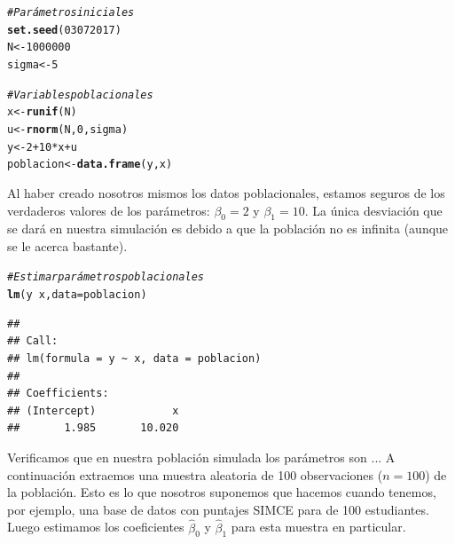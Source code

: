 \documentclass[12pt]{report}\usepackage[]{graphicx}\usepackage[]{color}
\makeatletter
\newcommand{\hlnum}[1]{\textcolor[rgb]{0.686,0.059,0.569}{#1}}%
\newcommand{\hlcom}[1]{\textcolor[rgb]{0.678,0.584,0.686}{\textit{#1}}}%
\newcommand{\hlopt}[1]{\textcolor[rgb]{0,0,0}{#1}}%
\newcommand{\hlstd}[1]{\textcolor[rgb]{0.345,0.345,0.345}{#1}}%
\newcommand{\hlkwb}[1]{\textcolor[rgb]{0.69,0.353,0.396}{#1}}%
\newcommand{\hlkwc}[1]{\textcolor[rgb]{0.333,0.667,0.333}{#1}}%
\newcommand{\hlkwd}[1]{\textcolor[rgb]{0.737,0.353,0.396}{\textbf{#1}}}%
\newenvironment{kframe}{%
 \def\at@end@of@kframe{}%
 \ifinner\ifhmode%
  \def\at@end@of@kframe{\end{minipage}}%
  \begin{minipage}{\columnwidth}%
 \fi\fi%
 \def\FrameCommand##1{\hskip\@totalleftmargin \hskip-\fboxsep
 \colorbox{shadecolor}{##1}\hskip-\fboxsep
     \hskip-\linewidth \hskip-\@totalleftmargin \hskip\columnwidth}%
 \MakeFramed {\advance\hsize-\width
   \@totalleftmargin\z@ \linewidth\hsize
   \@setminipage}}%
 {\par\unskip\endMakeFramed%
 \at@end@of@kframe}
\newenvironment{knitrout}{}{} %
\makeatother
\begin{document}
\begin{knitrout}
\color{fgcolor}\begin{kframe}
\begin{alltt}
\hlcom{# Parámetros iniciales}
\hlkwd{set.seed}\hlstd{(}\hlnum{03072017}\hlstd{)}
\hlstd{N} \hlkwb{<-} \hlnum{1000000}
\hlstd{sigma} \hlkwb{<-} \hlnum{5}

\hlcom{# Variables poblacionales}
\hlstd{x} \hlkwb{<-} \hlkwd{runif}\hlstd{(N)}
\hlstd{u} \hlkwb{<-} \hlkwd{rnorm}\hlstd{(N,} \hlnum{0}\hlstd{, sigma)}
\hlstd{y} \hlkwb{<-} \hlnum{2} \hlopt{+} \hlnum{10}\hlopt{*}\hlstd{x} \hlopt{+} \hlstd{u}
\hlstd{poblacion} \hlkwb{<-} \hlkwd{data.frame}\hlstd{(y,x)}
\end{alltt}
\end{kframe}
\end{knitrout}

Al haber creado nosotros mismos los datos poblacionales, estamos seguros de los verdaderos valores de los parámetros: $\beta_0=2$ y $\beta_1=10$. La única desviación que se dará en nuestra simulación es debido a que la población no es infinita (aunque se le acerca bastante).

\begin{knitrout}
\color{fgcolor}\begin{kframe}
\begin{alltt}
\hlcom{# Estimar parámetros poblacionales}
\hlkwd{lm}\hlstd{(y}\hlopt{~}\hlstd{x,} \hlkwc{data} \hlstd{= poblacion)}
\end{alltt}
\begin{verbatim}
## 
## Call:
## lm(formula = y ~ x, data = poblacion)
## 
## Coefficients:
## (Intercept)            x  
##       1.985       10.020
\end{verbatim}
\end{kframe}
\end{knitrout}

Verificamos que en nuestra población simulada los parámetros son ...
A continuación extraemos una muestra aleatoria de 100 observaciones ($n=100$) de la población. Esto es lo que nosotros suponemos que hacemos cuando tenemos, por ejemplo, una base de datos con puntajes SIMCE para de 100 estudiantes.
Luego estimamos los coeficientes $\hat\beta_0$ y $\hat\beta_1$ para esta muestra en particular.
\end{document}
